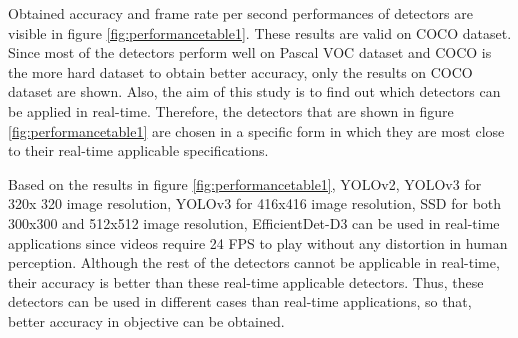\documentclass{article}
\begin{document}
\setlength{\parindent}{6ex}

\indent

Obtained accuracy and frame rate per second performances of detectors are visible 
in figure \ref{fig:performancetable1}. These results are valid on COCO dataset. 
Since most of the detectors perform well on Pascal VOC dataset and COCO is the more hard 
dataset to obtain better accuracy, only the results on COCO dataset are shown. Also, 
the aim of this study is to find out which detectors can be applied in real-time. 
Therefore, the detectors that are shown in figure \ref{fig:performancetable1} 
are chosen in a specific form in which they are most close to their real-time 
applicable specifications. \par

Based on the results in figure \ref{fig:performancetable1}, YOLOv2, YOLOv3 for 320x
320 image resolution, YOLOv3 for 416x416 image resolution, SSD for both 300x300 and 
512x512 image resolution, EfficientDet-D3 can be used in real-time applications since 
videos require 24 FPS to play without any distortion in human perception. Although 
the rest of the detectors cannot be applicable in real-time, their accuracy is better 
than these real-time applicable detectors. Thus, these detectors can be used in 
different cases than real-time applications, so that, better accuracy in objective 
can be obtained. 
\end{document}
